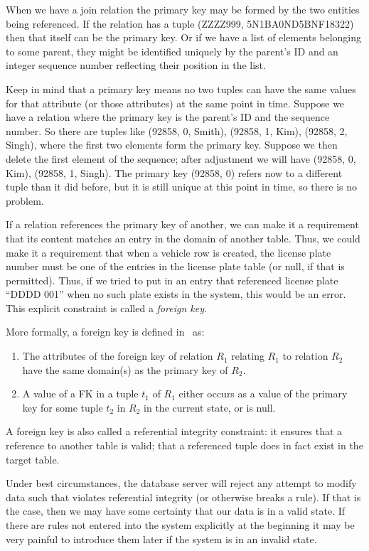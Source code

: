 \documentclass[a4paper]{report}
\begin{document}
When we have a join relation the primary key may be formed by the two entities being referenced. If the relation has a tuple (ZZZZ999, 5N1BA0ND5BNF18322) then that itself can be the primary key. Or if we have a list of elements belonging to some parent, they might be identified uniquely by the parent's ID and an integer sequence number reflecting their position in the list. 

Keep in mind that a primary key means no two tuples can have the same values for that attribute (or those attributes) at the same point in time. Suppose we have a relation where the primary key is the parent's ID and the sequence number. So there are tuples like (92858, 0, Smith), (92858, 1, Kim), (92858, 2, Singh), where the first two elements form the primary key. Suppose we then delete the first element of the sequence; after adjustment we will have (92858, 0, Kim), (92858, 1, Singh). The primary key (92858, 0) refers now to a different tuple than it did before, but it is still unique at this point in time, so there is no problem.

If a relation references the primary key of another, we can make it a requirement that its content matches an entry in the domain of another table. Thus, we could make it a requirement that when a vehicle row is created, the license plate number must be one of the entries in the license plate table (or null, if that is permitted). Thus, if we tried to put in an entry that referenced license plate ``DDDD 001'' when no such plate exists in the system, this would be an error. This explicit constraint is called a \textit{foreign key}. 

More formally, a foreign key is defined in~\cite{fds} as:
\begin{enumerate}
\item The attributes of the foreign key of relation $R_{1}$ relating $R_{1}$ to relation $R_{2}$ have the same domain(s) as the primary key of $R_{2}$.
\item A value of a FK in a tuple $t_{1}$ of $R_{1}$ either occurs as a value of the primary key for some tuple $t_{2}$ in $R_{2}$ in the current state, or is null. 
\end{enumerate}


A foreign key is also called a referential integrity constraint: it ensures that a reference to another table is valid; that a referenced tuple does in fact exist in the target table.

Under best circumstances, the database server will reject any attempt to modify data such that violates referential integrity (or otherwise breaks a rule). If that is the case, then we may have some certainty that our data is in a valid state. If there are rules not entered into the system explicitly at the beginning it may be very painful to introduce them later if the system is in an invalid state. 
\end{document}
